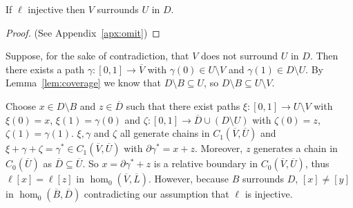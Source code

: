 \begin{lemma}\label{lem:cov_surrounds}
  If $\ell$ injective then $V$ surrounds $U$ in $D$.
\end{lemma}
\begin{proof}
  (See Appendix~\ref{apx:omit})
\end{proof}
\proofatend
  Suppose, for the sake of contradiction, that $V$ does not surround $U$ in $D$.
  Then there exists a path $\gamma : [0,1]\to\overline{V}$ with $\gamma(0)\in U\setminus V$ and $\gamma(1)\in D\setminus U$.
  By Lemma~\ref{lem:coverage} we know that $D\setminus B\subseteq U$, so $D\setminus B\subseteq U\setminus V$.

  Choose $x\in D\setminus B$ and $z\in \overline{D}$ such that there exist paths $\xi : [0,1]\to U\setminus V$ with $\xi(0) = x$, $\xi(1) = \gamma(0)$ and $\zeta : [0,1]\to \overline{D}\cup (D\setminus U)$ with $\zeta(0) = z$, $\zeta(1) = \gamma(1)$.
  $\xi, \gamma$ and $\zeta$ all generate chains in $C_1(\overline{V}, \overline{U})$ and $\xi + \gamma + \zeta = \gamma^*\in C_1(\overline{V}, \overline{U})$ with $\partial\gamma^* = x + z$.
  Moreover, $z$ generates a chain in $C_0(\overline{U})$ as $\overline{D}\subseteq\overline{U}$.
  So $x = \partial\gamma^* + z$ is a relative boundary in $C_0(\overline{V}, \overline{U})$, thus $\ell[x] = \ell[z]$ in $\hom_0(\overline{V}, \overline{L})$.
  However, because $B$ surrounds $D$, $[x]\neq [y]$ in $\hom_0(\overline{B}, \overline{D})$ contradicting our assumption that $\ell$ is injective.
\endproofatend

